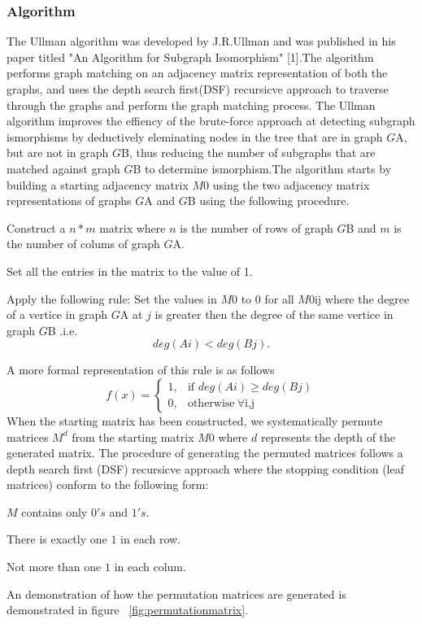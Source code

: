 \subsubsection{Algorithm}
The Ullman algorithm was developed by J.R.Ullman and was published in his paper titled "An Algorithm for Subgraph Isomorphism" [1].The algorithm performs graph matching on an adjacency matrix representation of both the graphs, and uses the depth search first(DSF) recursicve approach to traverse through the graphs and perform the graph matching process. The Ullman algorithm improves the effiency of the brute-force approach at detecting subgraph ismorphisms by deductively eleminating nodes in the tree that are in graph $G${\tiny A}, but are not in graph $G${\tiny B}, thus reducing the number of subgraphs that are matched against graph $G${\tiny B} to determine ismorphism.\newline\newline The algorithm starts by building a starting adjacency matrix $M0$ using the two adjacency matrix representations of graphs $G${\tiny A} and $G${\tiny B} using the following procedure.
\begin{myEnumerate}
\item Construct a $n * m$ matrix where $n$ is the number of rows of graph $G${\tiny B} and $m$ is the number of colums of graph $G${\tiny A}.
\item Set all the entries in the matrix to the value of 1.
\item Apply the following rule:
	Set the values in $M0$ to 0 for all $M0${\tiny ij} where the degree of a vertice in graph $G${\tiny A} at $j$ is greater then the degree of the same vertice in graph $G${\tiny B} .i.e. 
	\begin{equation}
		deg(Ai) < deg(Bj). 
	\end{equation}

\end{myEnumerate}
	A more formal representation of this rule is as follows
	\[
		f(x)= 
			\begin{cases}
				1,& \text{if } deg(Ai)\geq deg(Bj)\\ 
				0,              & \text{otherwise}\   \forall \text{i,j}
			\end{cases}
	\]
When the starting matrix has been constructed, we systematically permute matrices $M^d$ from the starting matrix $M0$ where $d$ represents the depth of the generated matrix. The procedure of generating the permuted matrices follows a depth search first (DSF) recursicve approach where the stopping condition (leaf matrices) conform to the following form:
\begin{myEnumerate}
\item $M$ contains only $0's$ and $1's$.
\item There is exactly one $1$ in each row.
\item Not more than one $1$ in each colum.
\end{myEnumerate}
An demonstration of how the permutation matrices are generated is demonstrated in figure ~\ref{fig:permutationmatrix}.


